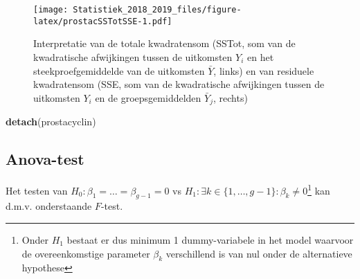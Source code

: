\documentclass[12pt,dutch,coursenotes]{book}
\newenvironment{Shaded}{\begin{snugshade}}{\end{snugshade}}
\newcommand{\KeywordTok}[1]{\textcolor[rgb]{0.13,0.29,0.53}{\textbf{#1}}}
\newcommand{\DataTypeTok}[1]{\textcolor[rgb]{0.13,0.29,0.53}{#1}}
\newcommand{\DecValTok}[1]{\textcolor[rgb]{0.00,0.00,0.81}{#1}}
\newcommand{\StringTok}[1]{\textcolor[rgb]{0.31,0.60,0.02}{#1}}
\newcommand{\ControlFlowTok}[1]{\textcolor[rgb]{0.13,0.29,0.53}{\textbf{#1}}}
\newcommand{\OperatorTok}[1]{\textcolor[rgb]{0.81,0.36,0.00}{\textbf{#1}}}
\newcommand{\NormalTok}[1]{#1}
\let\rmarkdownfootnote\footnote%
\def\footnote{\protect\rmarkdownfootnote}
\theoremstyle{definition}
\theoremstyle{definition}
\theoremstyle{definition}
\theoremstyle{remark}
\begin{document}
\begin{Shaded}
\end{Shaded}

\begin{figure}
\centering
\texttt{[image: Statistiek\_2018\_2019\_files/figure-latex/prostacSSTotSSE-1.pdf]}
\caption{\label{fig:prostacSSTotSSE}Interpretatie van de totale kwadratensom
(SSTot, som van de kwadratische afwijkingen tussen de uitkomsten
\(Y_{i}\) en het steekproefgemiddelde van de uitkomsten \(\bar Y\),
links) en van residuele kwadratensom (SSE, som van de kwadratische
afwijkingen tussen de uitkomsten \(Y_{i}\) en de groepsgemiddelden
\(\bar Y_j\), rechts)}
\end{figure}

\begin{Shaded}
\begin{Highlighting}[]
\KeywordTok{detach}\NormalTok{(prostacyclin)}
\end{Highlighting}
\end{Shaded}

\subsection{Anova-test}\label{anova-test}

Het testen van \(H_0: \beta_1=\ldots=\beta_{g-1}=0\) vs
\(H_1: \exists k \in\{1,\ldots,g-1\} : \beta_k \neq0\)\footnote{Onder
  \(H_1\) bestaat er dus minimum 1 dummy-variabele in het model waarvoor
  de overeenkomstige parameter \(\beta_k\) verschillend is van nul onder
  de alternatieve hypothese} kan d.m.v. onderstaande \(F\)-test.
\end{document}
